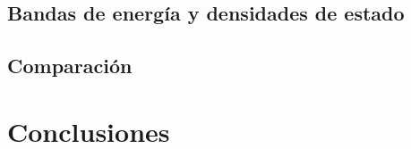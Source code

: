 \documentclass[xcolor=dvipsnames]{beamer}
\begin{document}
\subsection{Bandas de energ\'ia y densidades de estado}



\subsection{Comparaci\'on}


\section{Conclusiones}


\end{document}
